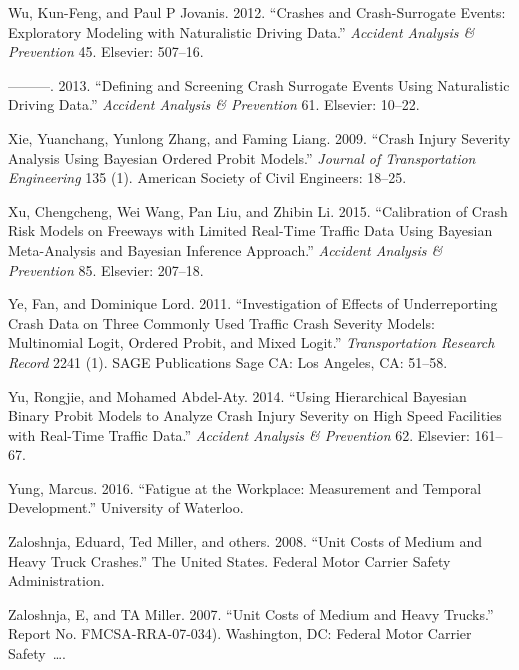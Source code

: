 \documentclass[12pt]{book}
\numberwithin{equation}{chapter}
\begin{document}
\leavevmode\hypertarget{ref-wu2012crashes}{}%
Wu, Kun-Feng, and Paul P Jovanis. 2012. ``Crashes and Crash-Surrogate Events: Exploratory Modeling with Naturalistic Driving Data.'' \emph{Accident Analysis \& Prevention} 45. Elsevier: 507--16.

\leavevmode\hypertarget{ref-wu2013defining}{}%
---------. 2013. ``Defining and Screening Crash Surrogate Events Using Naturalistic Driving Data.'' \emph{Accident Analysis \& Prevention} 61. Elsevier: 10--22.

\leavevmode\hypertarget{ref-xie2009crash}{}%
Xie, Yuanchang, Yunlong Zhang, and Faming Liang. 2009. ``Crash Injury Severity Analysis Using Bayesian Ordered Probit Models.'' \emph{Journal of Transportation Engineering} 135 (1). American Society of Civil Engineers: 18--25.

\leavevmode\hypertarget{ref-xu2015calibration}{}%
Xu, Chengcheng, Wei Wang, Pan Liu, and Zhibin Li. 2015. ``Calibration of Crash Risk Models on Freeways with Limited Real-Time Traffic Data Using Bayesian Meta-Analysis and Bayesian Inference Approach.'' \emph{Accident Analysis \& Prevention} 85. Elsevier: 207--18.

\leavevmode\hypertarget{ref-ye2011investigation}{}%
Ye, Fan, and Dominique Lord. 2011. ``Investigation of Effects of Underreporting Crash Data on Three Commonly Used Traffic Crash Severity Models: Multinomial Logit, Ordered Probit, and Mixed Logit.'' \emph{Transportation Research Record} 2241 (1). SAGE Publications Sage CA: Los Angeles, CA: 51--58.

\leavevmode\hypertarget{ref-yu2014using}{}%
Yu, Rongjie, and Mohamed Abdel-Aty. 2014. ``Using Hierarchical Bayesian Binary Probit Models to Analyze Crash Injury Severity on High Speed Facilities with Real-Time Traffic Data.'' \emph{Accident Analysis \& Prevention} 62. Elsevier: 161--67.

\leavevmode\hypertarget{ref-yung2016fatigue}{}%
Yung, Marcus. 2016. ``Fatigue at the Workplace: Measurement and Temporal Development.'' University of Waterloo.

\leavevmode\hypertarget{ref-zaloshnja2008unit}{}%
Zaloshnja, Eduard, Ted Miller, and others. 2008. ``Unit Costs of Medium and Heavy Truck Crashes.'' The United States. Federal Motor Carrier Safety Administration.

\leavevmode\hypertarget{ref-zaloshnja2007unit}{}%
Zaloshnja, E, and TA Miller. 2007. ``Unit Costs of Medium and Heavy Trucks.'' Report No. FMCSA-RRA-07-034). Washington, DC: Federal Motor Carrier Safety~\ldots{}.
\end{document}
